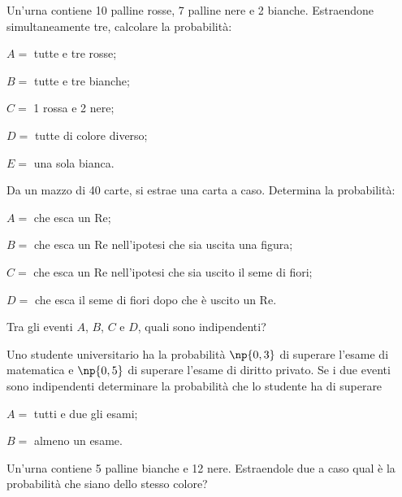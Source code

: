 \begin{esercizio}[\Ast]
 \label{ese:9.60}
 Un'urna contiene 10 palline rosse, 7 palline nere e 2 bianche. Estraendone simultaneamente tre, calcolare la probabilità:
\begin{itemize*}
 \item $ A= $ tutte e tre rosse;
 \item $ B= $ tutte e tre bianche;
 \item $ C= $ 1 rossa e 2 nere;
 \item $ D= $ tutte di colore diverso;
 \item $ E= $ una sola bianca.
\end{itemize*}
\end{esercizio}

\begin{esercizio}[\Ast]
 \label{ese:9.61}
 Da un mazzo di 40 carte, si estrae una carta a caso. Determina la probabilità:
\begin{itemize*}
\item $ A= $ che esca un Re;
\item $ B= $ che esca un Re nell'ipotesi che sia uscita una figura;
\item $ C= $ che esca un Re nell'ipotesi che sia uscito il seme di fiori;
\item $ D= $ che esca il seme di fiori dopo che è uscito un Re.
\end{itemize*}
Tra gli eventi $A$, $B$, $C$ e $D$, quali sono indipendenti?
\end{esercizio}

\begin{esercizio}[\Ast]
 \label{ese:9.62}
Uno studente universitario ha la probabilità $\np{0,3}$ di superare l'esame di matematica e $\np{0,5}$ di superare l'esame di diritto privato. Se i due eventi sono indipendenti determinare la probabilità che lo studente ha di superare
\begin{itemize*}
\item $ A= $ tutti e due gli esami;
\item $ B= $ almeno un esame.
\end{itemize*}
\end{esercizio}

\begin{esercizio}[\Ast]
 \label{ese:9.63}
Un'urna contiene 5 palline bianche e 12 nere. Estraendole due a caso qual è la probabilità che siano dello stesso colore?
\end{esercizio}

